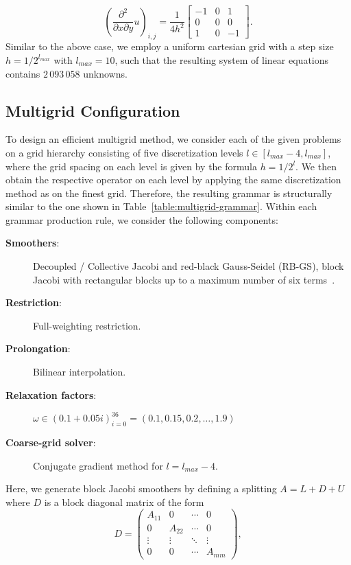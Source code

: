 \begin{equation*}
	\left(\frac{\partial^2}{\partial x \partial y} u\right)_{i,j} = 
	\frac{1}{4 h^2} \begin{bmatrix}
		-1 & 0 & 1\\
		0 & 0 & 0 \\
		1 & 0 & -1  
	\end{bmatrix}.
\end{equation*}
Similar to the above case, we employ a uniform cartesian grid with a step size $h = 1/2^{l_{max}}$ with $l_{max} = 10$, such that the resulting system of linear equations contains $2\,093\,058$ unknowns.
\subsection{Multigrid Configuration}
\label{sec:experiments1-multigrid-configuration}
To design an efficient multigrid method, we consider each of the given problems on a grid hierarchy consisting of five discretization levels $l \in \left[l_{max} - 4, l_{max}\right]$, where the grid spacing on each level is given by the formula $h = 1/2^l$.
We then obtain the respective operator on each level by applying the same discretization method as on the finest grid.
Therefore, the resulting grammar is structurally similar to the one shown in Table~\ref{table:multigrid-grammar}.
Within each grammar production rule, we consider the following components:
\begin{description}
	\item[\textbf{Smoothers}:] Decoupled / Collective Jacobi and red-black Gauss-Seidel (RB-GS), block Jacobi with rectangular blocks up to a maximum number of six terms~\cite{trottenberg2000multigrid}.
	\item[\textbf{Restriction}:] Full-weighting restriction.
	\item[\textbf{Prolongation}:] Bilinear interpolation.
	\item[\textbf{Relaxation factors}:] $\omega \in \left( 0.1 + 0.05i \right)_{i = 0}^{36} = \left(0.1, 0.15, 0.2, \dots, 1.9 \right)$
	\item[\textbf{Coarse-grid solver}:] Conjugate gradient method for $l = l_{max} - 4$.
\end{description}
Here, we generate block Jacobi smoothers by defining a splitting $A = L + D + U$ where $D$ is a block diagonal matrix of the form
\begin{equation*}
	D = 
		\begin{pmatrix}A_{11}&0&\cdots &0\\
			0&A_{22}&\cdots &0\\
			\vdots &\vdots &\ddots &\vdots \\0&0&\cdots &A_{mm}\end{pmatrix},
\end{equation*}

